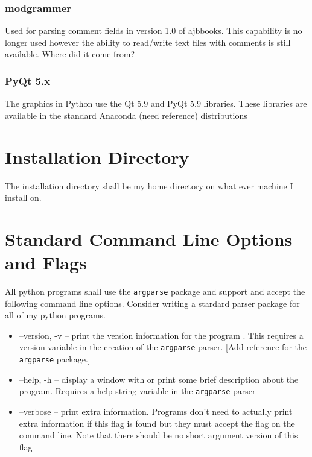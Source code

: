 \subsubsection{modgrammer}

Used for parsing comment fields in version 1.0 of ajbbooks. This
capability is no longer used however the ability to read/write
text files with comments is still available. Where did it come from?

\subsubsection{PyQt 5.x}

The graphics in Python use the Qt 5.9 and PyQt 5.9 libraries. These
libraries are available in the standard Anaconda (need reference)
distributions

\section{Installation Directory}

The installation directory shall be my home directory on what ever machine
I install on.

\section{Standard Command Line Options and Flags}

All python programs shall use the \texttt{argparse} package and
support and accept the following command line options. Consider
writing a stardard parser package for all of my python programs.

\begin{itemize}

  \item --version, -v -- print the version information for the program .
   This requires a version variable in the creation of the
   \texttt{argparse} parser.  [Add reference for the \texttt{argparse}
   package.]

  \item --help, -h -- display a window with or print some brief
    description about the program. Requires a help string variable in the 
    \texttt{argparse} parser 

  \item --verbose -- print extra information. Programs don't
    need to actually print extra information if this flag is found but
    they must accept the flag on the command line. Note that 
    there should be no short argument version of this flag
\end{itemize}

